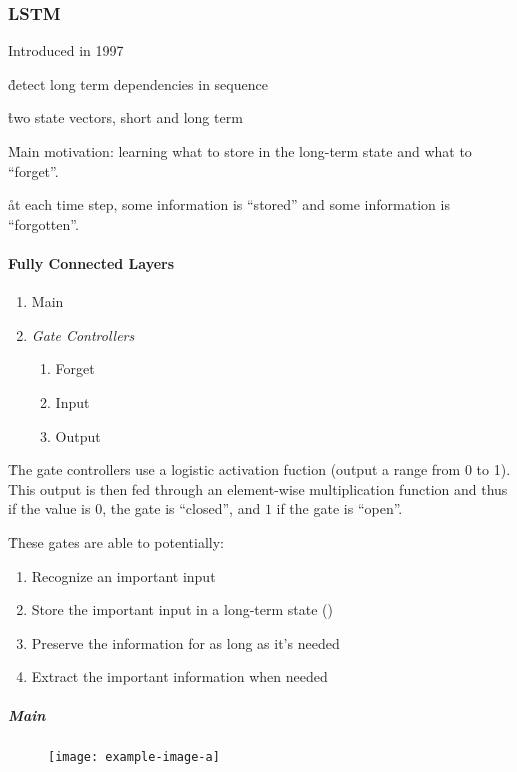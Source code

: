 \subsubsection{LSTM}

Introduced in 1997 %

\r{detect long term dependencies in sequence}

\r{two state vectors, short and long term}

\r{Main motivation: learning what to store in the long-term state and what to ``forget''.}

\r{at each time step, some information is ``stored'' and some information is ``forgotten''.}

\paragraph{Fully Connected Layers}


\begin{enumerate}[noitemsep,topsep=0pt]
	\item Main
	\item \textit{Gate Controllers}
	\begin{enumerate}[noitemsep,topsep=0pt]
		\item Forget
		\item Input
		\item Output
	\end{enumerate}
\end{enumerate}

\r{The gate controllers use a logistic activation fuction (output a range from 0 to 1). This output is then fed through an element-wise multiplication function and thus if the value is $0$, the gate is ``closed'', and $1$ if the gate is ``open''.}

\r{These gates are able to potentially:}

\begin{enumerate}[noitemsep,topsep=0pt]
	\item Recognize an important input
	\item Store the important input in a long-term state ()
	\item Preserve the information for as long as it's needed
	\item Extract the important information when needed
\end{enumerate}


\subparagraph{Main}

\begin{figure}
	\centering
	\texttt{[image: example-image-a]}\hfil
	\caption{}
\end{figure}

